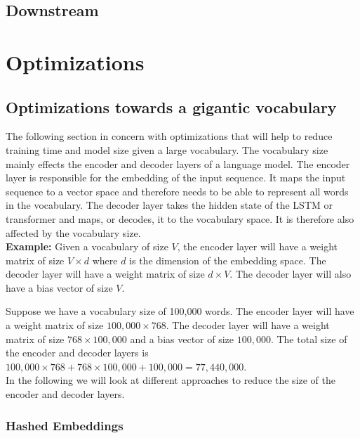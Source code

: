 \documentclass[11pt]{article}
\begin{document}
\subsection{Downstream}

\section{Optimizations}

\subsection{Optimizations towards a gigantic vocabulary}

The following section in concern with optimizations that will help to reduce training time and
model size given a large vocabulary. The vocabulary size mainly effects the encoder and decoder
layers of a language model. The encoder layer is responsible for the embedding of the input
sequence. It maps the input sequence to a vector space and therefore needs to be able to
represent all words in the vocabulary. The decoder layer takes the hidden state of the
LSTM or transformer and maps, or decodes, it to the vocabulary space. It is therefore also affected
by the vocabulary size.\\

\textbf{Example:}
Given a vocabulary of size $V$, the encoder layer will have a weight matrix of size
$V \times d$ where $d$ is the dimension of the embedding space. The decoder layer will have a
weight matrix of size $d \times V$. The decoder layer will also have a bias vector of size $V$.

Suppose we have a vocabulary size of 100,000 words. The encoder layer will have a weight matrix
of size $100,000 \times 768$. The decoder layer will have a weight matrix of size $768 \times 100,000$
and a bias vector of size $100,000$. The total size of the encoder and decoder layers is
$100,000 \times 768 + 768 \times 100,000 + 100,000 = 77,440,000$.\\

In the following we will look at different approaches to reduce the size of the encoder and decoder
layers.

\subsubsection{Hashed Embeddings}
\end{document}
